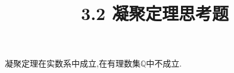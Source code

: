 \documentclass[windows,list,answers]{BHCexam}
\begin{document}
\everymath{\displaystyle}
\title{3.2 凝聚定理\quad 思考题}

\maketitle

\begin{questions}
    \question
    凝聚定理在实数系中成立,在有理数集$\mathbb{Q} $中不成立.
    \begin{solution}{1cm}
        \methodonly

    \end{solution}
\end{questions}
\end{document}

